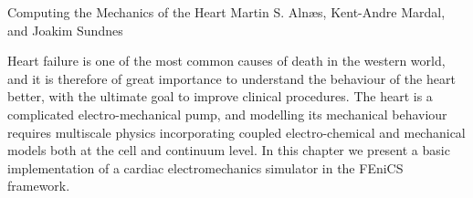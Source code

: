               {Computing the Mechanics of the Heart}
              {Martin S. Aln\ae{}s, Kent-Andre Mardal, and Joakim Sundnes}

\editornote{[alnes-4]}

Heart failure is one of the most common causes of death in the western
world, and it is therefore of great importance to understand the
behaviour of the heart better, with the ultimate goal to improve
clinical procedures. The heart is a complicated electro-mechanical
pump, and modelling its mechanical behaviour requires multiscale
physics incorporating coupled electro-chemical and mechanical models
both at the cell and continuum level.  In this chapter we present a
basic implementation of a cardiac electromechanics simulator in the
FEniCS framework.
